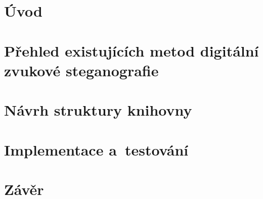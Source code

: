 \chapter{Úvod}
\label{cha:introduction}



\chapter{Přehled existujících metod digitální zvukové steganografie}
\label{cha:summary}



\chapter{Návrh struktury knihovny}
\label{cha:design}



\chapter{Implementace a~testování}
\label{cha:implementation}



\chapter{Závěr}
\label{cha:conclusion}
